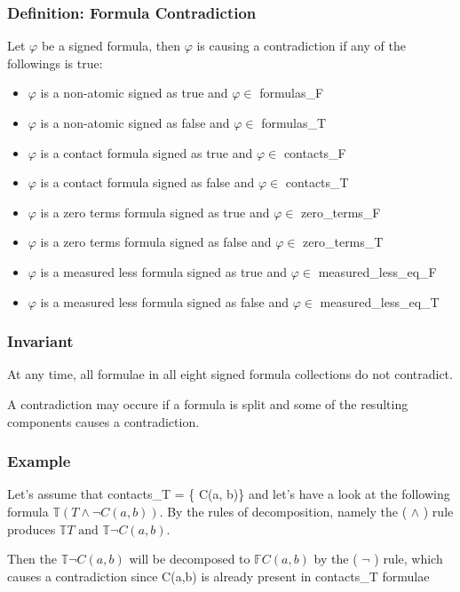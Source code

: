 \documentclass{article}
\begin{document}
		\subsubsection*{Definition: Formula Contradiction}
			Let $\varphi$ be a signed formula, then $\varphi$ is causing a contradiction if any of the followings is true:
			\begin{itemize}
				\item $\varphi$ is a non-atomic signed as true and $\varphi \in$ formulas\_F
				\item $\varphi$ is a non-atomic signed as false and $\varphi \in$ formulas\_T
				\item $\varphi$ is a contact formula signed as true and $\varphi \in$ contacts\_F
				\item $\varphi$ is a contact formula signed as false and $\varphi \in$ contacts\_T
				\item $\varphi$ is a zero terms formula signed as true and $\varphi \in$ zero\_terms\_F
				\item $\varphi$ is a zero terms formula signed as false and $\varphi \in$ zero\_terms\_T
				\item $\varphi$ is a measured less formula signed as true and $\varphi \in$ measured\_less\_eq\_F
				\item $\varphi$ is a measured less formula signed as false and $\varphi \in$ measured\_less\_eq\_T

			\end{itemize}

		\subsubsection*{Invariant}
			At any time, all formulae in all eight signed formula collections do not contradict.

			A contradiction may occure if a formula is split and some of the resulting components causes a contradiction.

		\subsubsection*{Example}
			Let's assume that contacts\_T = \{ C(a, b)\} and let's have a look at the following formula $\mathbb{T}(T \wedge \neg C(a,b))$.
			\newline
			By the rules of decomposition, namely the ( $\wedge$ ) rule produces $\mathbb{T}T \text{ and } \mathbb{T}\neg C(a,b)$. 

			Then the $\mathbb{T}\neg C(a,b)$ will be decomposed to $\mathbb{F} C(a,b)$ by the ( $\neg$ ) rule, which causes a contradiction
			since C(a,b) is already present in contacts\_T formulae
\end{document}
